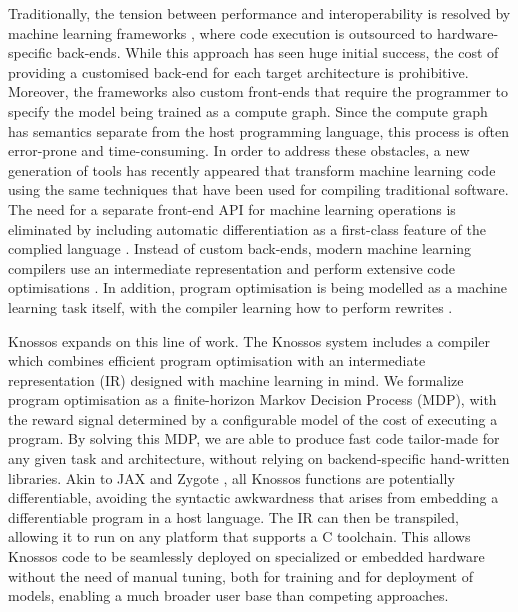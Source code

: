 \documentclass[fullpage,twocolumn]{article} %
\def\Cpp{{C\nolinebreak[4]\hspace{-.05em}\raisebox{.4ex}{\tiny\bf ++}} }
\begin{document}
Traditionally, the tension between performance and interoperability is resolved by machine learning frameworks \citep{paszkeAutomaticDifferentiationPyTorch2017a, abadiTensorFlowSystemLargeScale2016}, where code execution is outsourced to hardware-specific back-ends. While this approach has seen huge initial success, the cost of providing a customised back-end for each target architecture is prohibitive. Moreover, the frameworks also custom front-ends that require the programmer to specify the model being trained as a compute graph. Since the compute graph has semantics separate from the host programming language, this process is often error-prone and time-consuming. In order to address these obstacles, a new generation of tools has recently appeared that transform machine learning code using the same techniques that have been used for compiling traditional software. The need for a separate front-end API for machine learning operations is eliminated by including automatic differentiation as a first-class feature of the complied language \citep{innes2019zygote, jax}. Instead of custom back-ends, modern machine learning compilers use an intermediate representation and perform extensive code optimisations \citep{innes2019zygote, jax, merrienboerAutomaticDifferentiationML2018, weiDLVMModernCompiler2018, sotoudehISAMapperCompute2019, rotemGlowGraphLowering2018}. In addition, program optimisation is being modelled as a machine learning task itself, with the compiler learning how to perform rewrites \citep{chenLearningOptimizeTensor2018, chenTVMAutomatedEndtoEnd2018}. 

Knossos expands on this line of work. The Knossos system includes a compiler which combines efficient program optimisation with an intermediate representation (IR) designed with machine learning in mind. We formalize program optimisation as a finite-horizon Markov Decision Process (MDP), with the reward signal determined by a configurable model of the cost of executing a program. By solving this MDP, we are able to produce fast code tailor-made for any given task and architecture, without relying on backend-specific hand-written libraries. Akin to JAX \citep{jax} and Zygote \citep{innes2019zygote}, all Knossos functions are potentially differentiable, avoiding the syntactic awkwardness that arises from embedding a differentiable program in a host language. The IR can then be transpiled, allowing it to run on any platform that supports a \Cpp toolchain. This allows Knossos code to be seamlessly deployed on specialized or embedded hardware without the need of manual tuning, both for training and for deployment of models, enabling a much broader user base than competing approaches.
\end{document}
